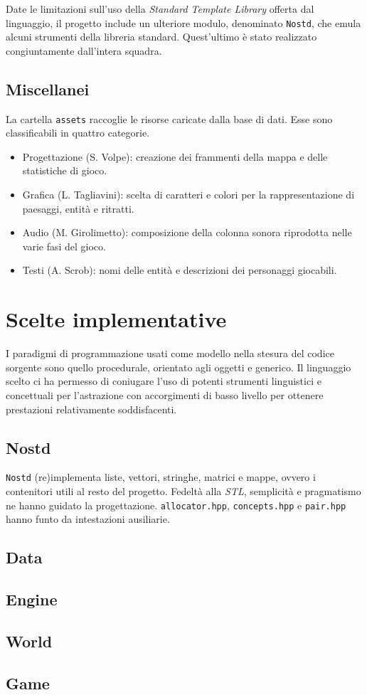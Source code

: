\documentclass[a4paper]{article}
\begin{document}
Date le limitazioni sull'uso della \emph{Standard Template Library} offerta dal
linguaggio, il progetto include un ulteriore modulo, denominato \verb!Nostd!, che emula
alcuni strumenti della libreria standard. Quest'ultimo \`e stato realizzato
congiuntamente dall'intera squadra.

\subsection{Miscellanei}

La cartella \verb!assets! raccoglie le risorse caricate dalla base di dati.
Esse sono classificabili in quattro categorie.

\begin{itemize}
  \item Progettazione (S. Volpe): creazione dei frammenti della mappa e delle
    statistiche di gioco.
  \item Grafica (L. Tagliavini): scelta di caratteri e colori per la
    rappresentazione di paesaggi, entit\`a e ritratti.
  \item Audio (M. Girolimetto): composizione della colonna sonora riprodotta
    nelle varie fasi del gioco.
  \item Testi (A. Scrob): nomi delle entit\`a e descrizioni dei personaggi
    giocabili.
\end{itemize}

\section{Scelte implementative}

I paradigmi di programmazione usati come modello nella stesura del codice
sorgente sono quello procedurale, orientato agli oggetti e generico. Il
linguaggio scelto ci ha permesso di coniugare l'uso di potenti strumenti
linguistici e concettuali per l'astrazione con accorgimenti di basso livello
per ottenere prestazioni relativamente soddisfacenti.

\subsection{Nostd}
\verb!Nostd! (re)implementa liste, vettori, stringhe, matrici e mappe, ovvero i
contenitori utili al resto del progetto. Fedelt\`a alla \emph{STL},
semplicit\`a e pragmatismo ne hanno guidato la progettazione.
\verb!allocator.hpp!, \verb!concepts.hpp! e \verb!pair.hpp! hanno funto da
intestazioni ausiliarie.

\subsection{Data}

\subsection{Engine}

\subsection{World}

\subsection{Game}
\end{document}
